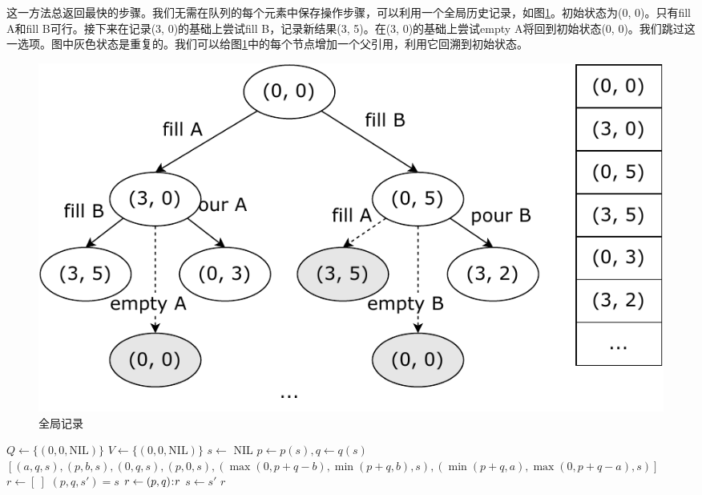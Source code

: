 \documentclass[b5paper]{ctexart}
\begin{document}
这一方法总返回最快的步骤。我们无需在队列的每个元素中保存操作步骤，可以利用一个全局历史记录，如图\ref{fig:water-jugs}。初始状态为(0, 0)。只有fill A和fill B可行。接下来在记录(3, 0)的基础上尝试fill B，记录新结果(3, 5)。在(3, 0)的基础上尝试empty A将回到初始状态(0, 0)。我们跳过这一选项。图中灰色状态是重复的。我们可以给图\ref{fig:water-jugs}中的每个节点增加一个父引用，利用它回溯到初始状态。

\begin{figure}[htbp]
  \centering
  \includegraphics[scale=0.5]{img/water-jugs}
  \caption{全局记录}
  \label{fig:water-jugs}
\end{figure}

\begin{algorithmic}[1]
  \State $Q \gets \{(0, 0, \text{NIL})\}$
  \State $V \gets \{(0, 0, \text{NIL})\}$  
    \State $s \gets$ 
      \State \Return {}
    \Else
          \State {}
          \State {}
        \EndIf
      \EndFor
    \EndIf
  \EndWhile
  \State \Return NIL
\EndFunction
\Statex
{}
  \State $p \gets p(s), q \gets q(s)$
  \State \Return $[(a, q, s), (p, b, s), (0, q, s), (p, 0, s), (\max(0, p + q - b), \min(p + q, b), s), (\min(p + q, a), \max(0, p + q - a), s)]$
\EndFunction
\Statex
{}
  \State $r \gets [\ ]$
    \State $(p, q, s') = s$
    \State $r \gets (p, q) \mathbin{\!:\!} r$
    \State $s \gets s'$
  \EndWhile
  \State \Return $r$
\EndFunction
\end{algorithmic}

\begin{Exercise}
\end{Exercise}
\end{document}

